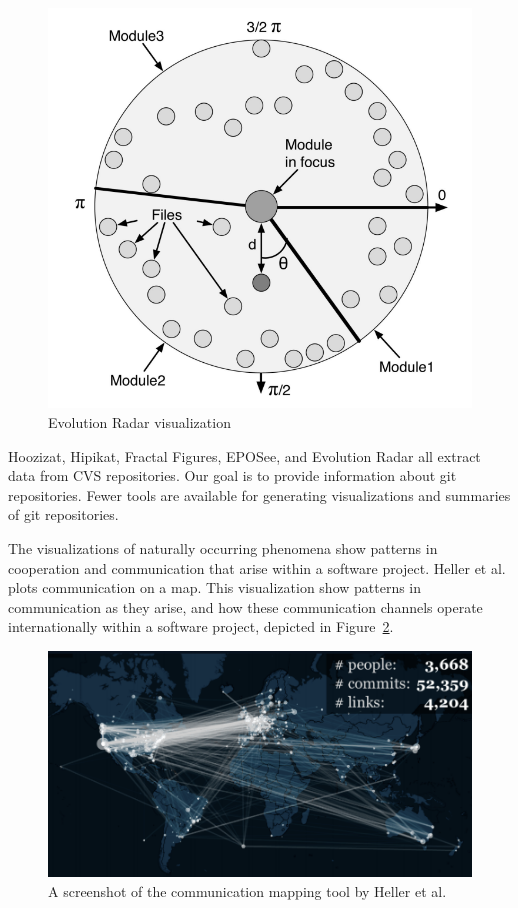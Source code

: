 \begin{figure}[htpb]
  \centering
  \includegraphics[width=0.8\linewidth]{Figures/introduction/evo_radar.png}
  \caption{Evolution Radar visualization\cite{Ambros2009}}
  \label{fig:evolution_radar}
\end{figure}

Hoozizat, Hipikat, Fractal Figures, EPOSee, and Evolution Radar all
extract data from CVS repositories. Our goal is to provide information
about git repositories. Fewer tools are available for generating
visualizations and summaries of git repositories.

The visualizations of naturally occurring phenomena show patterns
in cooperation and communication that arise within a software project.
Heller et al.\cite{Heller2011} plots communication on a map.
This visualization show patterns in communication as they arise, and how
these communication channels operate internationally within a software
project, depicted in Figure~\ref{fig:heller_map}.

\begin{figure}[htpb]
  \centering
  \includegraphics[width=0.8\linewidth]{Figures/background/heller_map.png}
  \caption{A screenshot of the communication mapping tool by Heller et
    al.\cite{Heller2011}}
  \label{fig:heller_map}
\end{figure}

